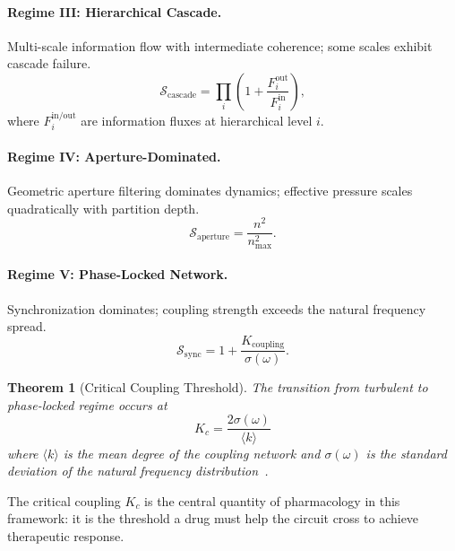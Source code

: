 \documentclass[twocolumn,10pt]{article}
\newtheorem{theorem}{Theorem}[section]
\theoremstyle{remark}
\begin{document}
\paragraph{Regime III: Hierarchical Cascade.}
Multi-scale information flow with intermediate coherence; some scales exhibit cascade failure.
\begin{equation}
  \mathcal{S}_{\mathrm{cascade}} = \prod_{i} \left(1 + \frac{F_i^{\mathrm{out}}}{F_i^{\mathrm{in}}}\right),
\end{equation}
where $F_i^{\mathrm{in/out}}$ are information fluxes at hierarchical level $i$.

\paragraph{Regime IV: Aperture-Dominated.}
Geometric aperture filtering dominates dynamics; effective pressure scales quadratically with partition depth.
\begin{equation}
  \mathcal{S}_{\mathrm{aperture}} = \frac{n^2}{n_{\max}^2}.
\end{equation}

\paragraph{Regime V: Phase-Locked Network.}
Synchronization dominates; coupling strength exceeds the natural frequency spread.
\begin{equation}
  \mathcal{S}_{\mathrm{sync}} = 1 + \frac{K_{\mathrm{coupling}}}{\sigma(\omega)}.
\end{equation}

\begin{theorem}[Critical Coupling Threshold]
\label{thm:critical}
The transition from turbulent to phase-locked regime occurs at
\begin{equation}
  \boxed{K_c = \frac{2\sigma(\omega)}{\langle k \rangle}}
  \label{eq:kc}
\end{equation}
where $\langle k \rangle$ is the mean degree of the coupling network and $\sigma(\omega)$ is the standard deviation of the natural frequency distribution~\citep{strogatz2000kuramoto,acebron2005kuramoto}.
\end{theorem}

The critical coupling $K_c$ is the central quantity of pharmacology in this framework: it is the threshold a drug must help the circuit cross to achieve therapeutic response.

\end{document}
